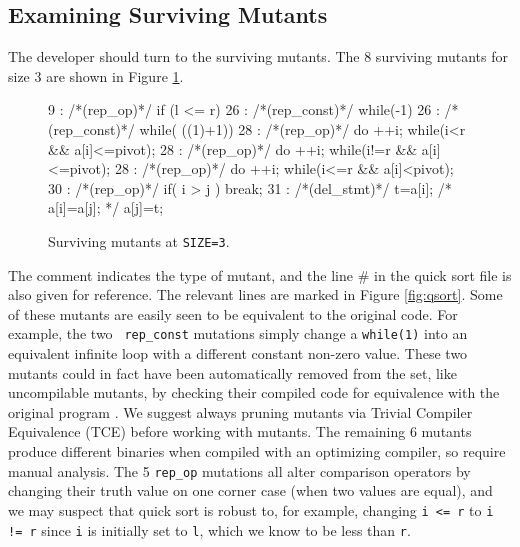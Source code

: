 \documentclass[conference]{IEEEtran}
\begin{document}
\subsection{Examining Surviving Mutants}

The developer should turn to the surviving mutants.  The 8 surviving
mutants for size 3 are shown in Figure \ref{fig:survivors}.


\begin{figure}
{\scriptsize
\begin{code}
 9 :   /*(rep\_op)*/ if (l <= r) 
 26 :  /*(rep\_const)*/ while(-1)
 26 :  /*(rep\_const)*/ while( ((1)+1))
 28 :  /*(rep\_op)*/ do ++i; while(i<r \&\& a[i]<=pivot);
 28 :  /*(rep\_op)*/ do ++i; while(i!=r \&\& a[i]<=pivot);
 28 :  /*(rep\_op)*/ do ++i; while(i<=r \&\& a[i]<pivot);
 30 :  /*(rep\_op)*/ if( i > j ) break;
 31 :  /*(del\_stmt)*/ t=a[i]; /*  a[i]=a[j]; */  a[j]=t;
\end{code}
}
\caption{Surviving mutants at {\tt SIZE=3}.}
\label{fig:survivors}
\end{figure}

The comment indicates the type of mutant, and the line \# in the quick
sort file is also given for reference.  The relevant lines are marked
in Figure \ref{fig:qsort}.  Some of these mutants are easily seen to
be equivalent to the original code.  For example, the two {\tt
  rep\_const} mutations simply change a {\tt while(1)} into an
equivalent infinite loop with a different constant non-zero value.
These two mutants could in fact have been automatically removed from
the set, like uncompilable mutants, by checking their compiled code
for equivalence with the original program \cite{TCE}.  We suggest
always pruning mutants via Trivial Compiler Equivalence (TCE) before
working with mutants.  The remaining 6 mutants produce different
binaries when compiled with an optimizing compiler, so require manual
analysis.  The 5 {\tt rep\_op} mutations all alter comparison
operators by changing their truth value on one corner case (when two
values are equal), and we may suspect that quick sort is robust to,
for example, changing {\tt i <= r} to {\tt i != r} since {\tt i} is
initially set to {\tt l}, which we know to be less than {\tt r}.
\end{document}
